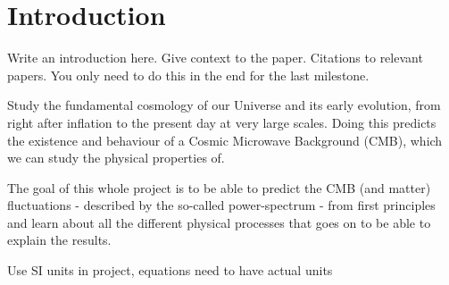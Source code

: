 \section{Introduction}

Write an introduction here. 
Give context to the paper. 
Citations to relevant papers. 
You only need to do this in the end for the last milestone.

Study the fundamental cosmology of our Universe and its early evolution, from right after inflation to the present day at very large scales. Doing this predicts the existence and behaviour of a Cosmic Microwave Background (CMB), which we can study the physical properties of.

The goal of this whole project is to be able to predict the CMB (and matter) fluctuations - described by the so-called power-spectrum - from first principles and learn about all the different physical processes that goes on to be able to explain the results. 

Use SI units in project, equations need to have actual units
   
